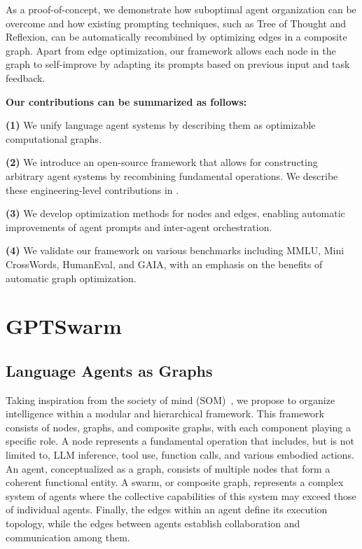 \documentclass{article}
\theoremstyle{plain}
\theoremstyle{definition}
\theoremstyle{remark}
\begin{document}
As a proof-of-concept, we demonstrate how suboptimal agent organization can be overcome and how existing prompting techniques, such as Tree of Thought and Reflexion, can be automatically recombined by optimizing edges in a composite graph.
Apart from edge optimization, our framework allows each node in the graph to self-improve by adapting its prompts based on previous input and task feedback.

\textbf{Our contributions can be summarized as follows:}

\noindent \textbf{(1)} We unify language agent systems by describing them as optimizable computational graphs.
\vspace{-3pt}

\noindent \textbf{(2)} We introduce an open-source framework that allows for constructing arbitrary agent systems by recombining fundamental operations.
We describe these engineering-level contributions in .
\vspace{-3pt}

\noindent \textbf{(3)}  We develop optimization methods for nodes and edges, enabling automatic improvements of agent prompts and inter-agent orchestration.
\vspace{-3pt}

\noindent \textbf{(4)} We validate our framework on various benchmarks including MMLU, Mini CrossWords, HumanEval, and GAIA,  with an emphasis on the benefits of automatic graph optimization.


\section{GPTSwarm}

\subsection{Language Agents as Graphs}

Taking inspiration from the society of mind (SOM)~\citep{minsky1988society, zhuge2023mindstorms}, we propose to organize intelligence within a modular and hierarchical framework.
This framework consists of nodes, graphs, and composite graphs, with each component playing a specific role.
A node represents a fundamental operation that includes, but is not limited to, LLM inference, tool use, function calls, and various embodied actions.
An agent, conceptualized as a graph, consists of multiple nodes that form a coherent functional entity.
A swarm, or composite graph, represents a complex system of agents where the collective capabilities of this system may exceed those of individual agents. 
Finally, the edges within an agent define its execution topology, while the edges between agents establish collaboration and communication among them.
\end{document}
